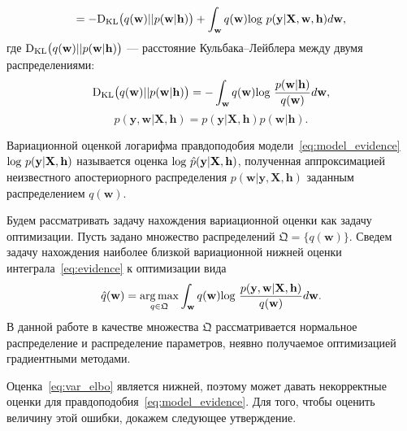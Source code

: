 $$
= -\textnormal{D}_\textnormal{KL} \bigl(q(\mathbf{w})||p(\mathbf{w}|\mathbf{h})\bigr) + \int_{\mathbf{w}} q(\mathbf{w})\textnormal{log}~{p(\mathbf{y}|\mathbf{X},\mathbf{w},\mathbf{h})} d \mathbf{w},
$$
где $\textnormal{D}_\textnormal{KL}\bigl(q(\mathbf{w})||p(\mathbf{w} |\mathbf{h})\bigr)$ --- расстояние Кульбака--Лейблера между двумя распределениями: $$\textnormal{D}_\textnormal{KL}\bigl(q(\mathbf{w})||p(\mathbf{w} |\mathbf{h})\bigr) = -\int_{\mathbf{w}} q(\mathbf{w})\textnormal{log}~\frac{p(\mathbf{w} | \mathbf{h})}{q(\mathbf{w})}d\mathbf{w},$$
$$
p(\mathbf{y},\mathbf{w}|\mathbf{X},\mathbf{h}) = p(\mathbf{y}|\mathbf{X},\mathbf{h})p(\mathbf{w}|\mathbf{h}).
$$

{
\begin{defin} Вариационной оценкой логарифма правдоподобия модели~\eqref{eq:model_evidence} $\textnormal{log}~p(\mathbf{y}|\mathbf{X},\mathbf{h})$ называется оценка $\textnormal{log}~\hat{p}(\mathbf{y}|\mathbf{X},\mathbf{h})$, полученная аппроксимацией неизвестного апостериорного распределения $p(\mathbf{w}| \mathbf{y}, \mathbf{X}, \mathbf{h})$ заданным распределением $q(\mathbf{w})$.
\end{defin}
}


Будем рассматривать задачу нахождения вариационной оценки как задачу оптимизации. Пусть задано множество распределений $\mathfrak{Q} =\{q(\mathbf{w})\}$. Сведем задачу нахождения наиболее близкой вариационной нижней оценки интеграла~\eqref{eq:evidence} к оптимизации вида
\[
     \hat{q}(\mathbf{w}) = \operatorname*{arg\,max}_{q \in \mathfrak{Q}}  \int_{\mathbf{w}} q(\mathbf{w})\textnormal{log}~\frac{p(\mathbf{y},\mathbf{w}|\mathbf{X},\mathbf{h})}{q(\mathbf{w})}d\mathbf{w}.
\]  
В данной работе в качестве множества $\mathfrak{Q}$ рассматривается нормальное распределение и распределение параметров, неявно получаемое оптимизацией градиентными методами. 

Оценка~\eqref{eq:var_elbo} является нижней, поэтому может давать некорректные оценки для правдоподобия~\eqref{eq:model_evidence}. Для того, чтобы оценить величину этой ошибки, докажем следующее утверждение.

